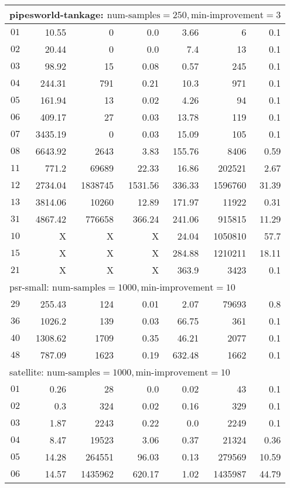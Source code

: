 \begin{longtable}{|c||r|r|r||r|r|r|}
\multicolumn{7}{|l|}{pipesworld-tankage: $\text{num-samples}=250,\text{min-improvement}=3$}\\\hline
$01$ & 10.55 & 0 & 0.0 & 3.66 & 6 & 0.1 \\\hline
$02$ & 20.44 & 0 & 0.0 & 7.4 & 13 & 0.1 \\\hline
$03$ & 98.92 & 15 & 0.08 & 0.57 & 245 & 0.1 \\\hline
$04$ & 244.31 & 791 & 0.21 & 10.3 & 971 & 0.1 \\\hline
$05$ & 161.94 & 13 & 0.02 & 4.26 & 94 & 0.1 \\\hline
$06$ & 409.17 & 27 & 0.03 & 13.78 & 119 & 0.1 \\\hline
$07$ & 3435.19 & 0 & 0.03 & 15.09 & 105 & 0.1 \\\hline
$08$ & 6643.92 & 2643 & 3.83 & 155.76 & 8406 & 0.59 \\\hline
$11$ & 771.2 & 69689 & 22.33 & 16.86 & 202521 & 2.67 \\\hline
$12$ & 2734.04 & 1838745 & 1531.56 & 336.33 & 1596760 & 31.39 \\\hline
$13$ & 3814.06 & 10260 & 12.89 & 171.97 & 11922 & 0.31 \\\hline
$31$ & 4867.42 & 776658 & 366.24 & 241.06 & 915815 & 11.29 \\\hline
$10$ &  X &  X &  X & 24.04 & 1050810 & 57.7 \\\hline
$15$ &  X &  X &  X & 284.88 & 1210211 & 18.11 \\\hline
$21$ &  X &  X &  X & 363.9 & 3423 & 0.1 \\\hline

\multicolumn{7}{|l|}{psr-small: $\text{num-samples}=1000,\text{min-improvement}=10$}\\\hline
$29$ & 255.43 & 124 & 0.01 & 2.07 & 79693 & 0.8 \\\hline
$36$ & 1026.2 & 139 & 0.03 & 66.75 & 361 & 0.1 \\\hline
$40$ & 1308.62 & 1709 & 0.35 & 46.21 & 2077 & 0.1 \\\hline
$48$ & 787.09 & 1623 & 0.19 & 632.48 & 1662 & 0.1 \\\hline

\multicolumn{7}{|l|}{satellite: $\text{num-samples}=1000,\text{min-improvement}=10$}\\\hline
$01$ & 0.26 & 28 & 0.0 & 0.02 & 43 & 0.1 \\\hline
$02$ & 0.3 & 324 & 0.02 & 0.16 & 329 & 0.1 \\\hline
$03$ & 1.87 & 2243 & 0.22 & 0.0 & 2249 & 0.1 \\\hline
$04$ & 8.47 & 19523 & 3.06 & 0.37 & 21324 & 0.36 \\\hline
$05$ & 14.28 & 264551 & 96.03 & 0.13 & 279569 & 10.59 \\\hline
$06$ & 14.57 & 1435962 & 620.17 & 1.02 & 1435987 & 44.79 \\\hline


\end{longtable}
